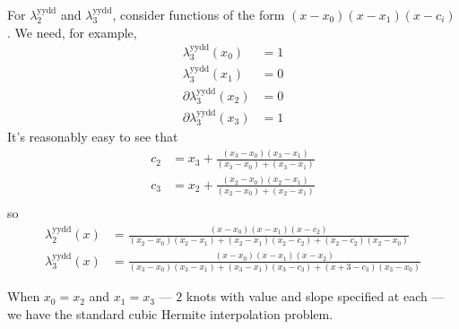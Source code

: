 For $\lambda^{\text{yydd}}_2$ and $\lambda^{\text{yydd}}_3$, 
consider functions of the form $(x-x_0)(x-x_1)(x-c_i)$.
We need, for example, 
\begin{align}
\lambda^{\text{yydd}}_3(x_0) & = 1 \\ 
\lambda^{\text{yydd}}_3(x_1) & = 0 \nonumber \\
\partial\lambda^{\text{yydd}}_3(x_2) & = 0 \nonumber \\
\partial\lambda^{\text{yydd}}_3(x_3) & = 1 \nonumber 
\end{align}
It's reasonably easy to see that 
\begin{align}
c_2 & = x_3 + 
\frac{(x_3 - x_0)(x_3 - x_1)}{(x_3 - x_0) + (x_3 - x_1)} \\
c_3 & = x_2 + 
\frac{(x_2 - x_0)(x_2 - x_1)}{(x_2 - x_0) + (x_2 - x_1)} \\
\end{align}
so
\begin{align}
\lambda^{\text{yydd}}_2(x) & =
\frac{(x-x_0)(x-x_1)(x-c_2)}
{
(x_2-x_0)(x_2-x_1) +
(x_2-x_1)(x_2-c_2) +
(x_2-c_2)(x_2-x_0)}
\\
\lambda^{\text{yydd}}_3(x) & =
\frac{(x-x_0)(x-x_1)(x-x_2)}
{
(x_3-x_0)(x_3-x_1) +
(x_3-x_1)(x_3-c_3) +
(x+3-c_3)(x_3-x_0)}
\nonumber
\end{align}

\label{sec:Hermite-yydd}

When $x_0 = x_2$ and $x_1 = x_3$ --- $2$ knots with value and 
slope specified at each --- 
we have the standard cubic Hermite interpolation
problem\cite{wiki:cubic-hermite-spline}.

